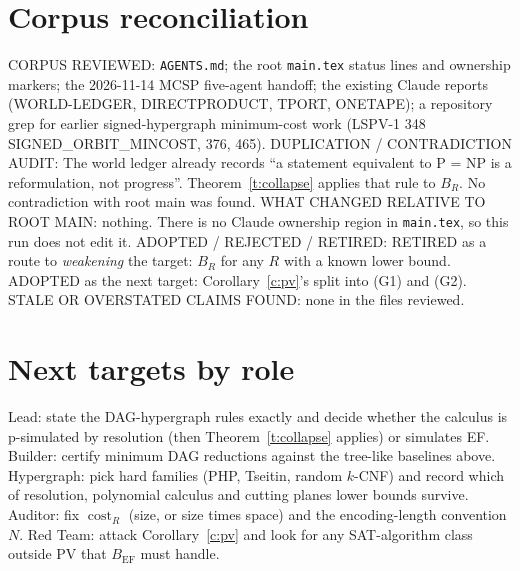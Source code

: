 \documentclass[11pt]{article}
\begin{document}
\section{Corpus reconciliation}
CORPUS REVIEWED: \texttt{AGENTS.md}; the root \texttt{main.tex} status lines and ownership markers; the 2026-11-14 MCSP five-agent handoff; the existing Claude reports (WORLD-LEDGER, DIRECTPRODUCT, TPORT, ONETAPE); a repository grep for earlier signed-hypergraph minimum-cost work (LSPV-1 348 SIGNED\_ORBIT\_MINCOST, 376, 465).
DUPLICATION / CONTRADICTION AUDIT: The world ledger already records ``a statement equivalent to P = NP is a reformulation, not progress''. Theorem~\ref{t:collapse} applies that rule to $B_R$. No contradiction with root main was found.
WHAT CHANGED RELATIVE TO ROOT MAIN: nothing. There is no Claude ownership region in \texttt{main.tex}, so this run does not edit it.
ADOPTED / REJECTED / RETIRED: RETIRED as a route to \emph{weakening} the target: $B_R$ for any $R$ with a known lower bound. ADOPTED as the next target: Corollary~\ref{c:pv}'s split into (G1) and (G2).
STALE OR OVERSTATED CLAIMS FOUND: none in the files reviewed.

\section{Next targets by role}
Lead: state the DAG-hypergraph rules exactly and decide whether the calculus is p-simulated by resolution (then Theorem~\ref{t:collapse} applies) or simulates EF.
Builder: certify minimum DAG reductions against the tree-like baselines above.
Hypergraph: pick hard families (PHP, Tseitin, random $k$-CNF) and record which of resolution, polynomial calculus and cutting planes lower bounds survive.
Auditor: fix $\operatorname{cost}_R$ (size, or size times space) and the encoding-length convention $N$.
Red Team: attack Corollary~\ref{c:pv} and look for any SAT-algorithm class outside PV that $B_{\mathrm{EF}}$ must handle.
\end{document}
